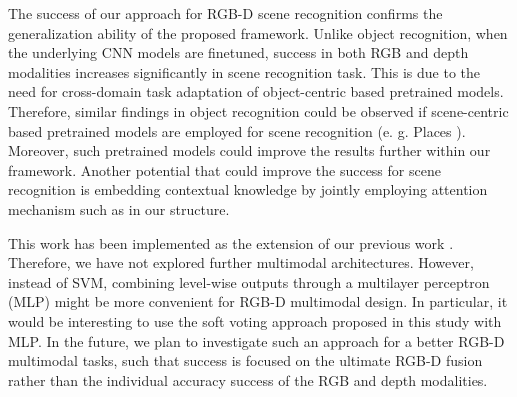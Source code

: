 The success of our approach for RGB-D scene recognition confirms the generalization ability of the proposed framework. Unlike object recognition, when the underlying CNN models are finetuned, success in both RGB and depth modalities increases significantly in scene recognition task. This is due to the need for cross-domain task adaptation of object-centric based pretrained models. Therefore, similar findings in object recognition could be observed if scene-centric based pretrained models are employed for scene recognition (e. g. Places \citep{Zhou_NIPS_2014}). Moreover, such pretrained models could improve the results further within our framework. Another potential that could improve the success for scene recognition is embedding contextual knowledge by jointly employing attention mechanism such as \cite{Fukui_2019_CVPR} in our structure.

This work has been implemented as the extension of our previous work \citep{Caglayan_ECCVW_2018}. Therefore, we have not explored further multimodal architectures. However, instead of SVM, combining level-wise outputs through a multilayer perceptron (MLP) might be more convenient for RGB-D multimodal design. In particular, it would be interesting to use the soft voting approach proposed in this study with MLP. In the future, we plan to investigate such an approach for a better RGB-D multimodal tasks, such that success is focused on the ultimate RGB-D fusion rather than the individual accuracy success of the RGB and depth modalities.